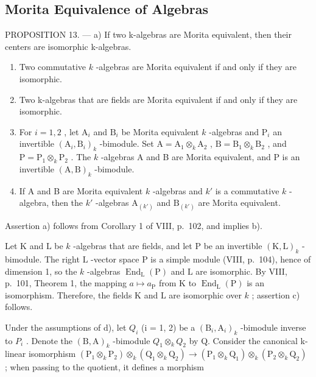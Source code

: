 \subsection{Morita Equivalence of Algebras}

PROPOSITION 13. --- a) If two k-algebras are Morita equivalent, then their centers are isomorphic k-algebras.

\begin{enumerate}
\def\labelenumi{\alph{enumi})}
\setcounter{enumi}{1}
\item
  Two commutative \(k\) -algebras are Morita equivalent if and only if they are isomorphic.
\item
  Two k-algebras that are fields are Morita equivalent if and only if they are isomorphic.
\item
  For \(i = 1,2\) , let \(\mathrm{A}_i\) and \(\mathrm{B}_i\) be Morita equivalent \(k\) -algebras and \(\mathrm{P}_i\) an invertible \((\mathrm{A}_i,\mathrm{B}_i)_k\) -bimodule. Set \(\mathrm{A} = \mathrm{A}_1\otimes_k\mathrm{A}_2\) , \(\mathrm{B} = \mathrm{B}_1\otimes_k\mathrm{B}_2\) , and \(\mathrm{P} = \mathrm{P}_1 \otimes_k \mathrm{P}_2\) . The \(k\) -algebras A and B are Morita equivalent, and P is an invertible \((\mathrm{A}, \mathrm{B})_k\) -bimodule.
\item
  If A and B are Morita equivalent \(k\) -algebras and \(k'\) is a commutative \(k\) -algebra, then the \(k'\) -algebras \(\mathrm{A}_{(k')}\) and \(\mathrm{B}_{(k')}\) are Morita equivalent.
\end{enumerate}

Assertion a) follows from Corollary 1 of VIII, p.~102, and implies b).

Let \(\mathrm{K}\) and \(\mathrm{L}\) be \(k\) -algebras that are fields, and let \(\mathrm{P}\) be an invertible \((\mathrm{K},\mathrm{L})_k\) -bimodule. The right \(\mathrm{L}\) -vector space \(\mathrm{P}\) is a simple module (VIII, p.~104), hence of dimension 1, so the \(k\) -algebras \(\operatorname{End}_{\mathrm{L}}(\mathrm{P})\) and \(\mathrm{L}\) are isomorphic. By VIII, p.~101, Theorem 1, the mapping \(a\mapsto a_{\mathrm{P}}\) from \(\mathrm{K}\) to \(\operatorname{End}_{\mathrm{L}}(\mathrm{P})\) is an isomorphism. Therefore, the fields \(\mathrm{K}\) and \(\mathrm{L}\) are isomorphic over \(k\) ; assertion c) follows.

Under the assumptions of d), let \(Q_{i}\) (i = 1, 2) be a \((\mathrm{B}_{i}, \mathrm{A}_{i})_{k}\) -bimodule inverse to \(P_{i}\) . Denote the \((\mathrm{B}, \mathrm{A})_{k}\) -bimodule \(Q_{1} \otimes_{k} Q_{2}\) by Q. Consider the canonical k-linear isomorphism \((\mathrm{P}_{1} \otimes_{k} \mathrm{P}_{2}) \otimes_{k} (\mathrm{Q}_{1} \otimes_{k} \mathrm{Q}_{2}) \to (\mathrm{P}_{1} \otimes_{k} \mathrm{Q}_{1}) \otimes_{k} (\mathrm{P}_{2} \otimes_{k} \mathrm{Q}_{2})\) ; when passing to the quotient, it defines a morphism

